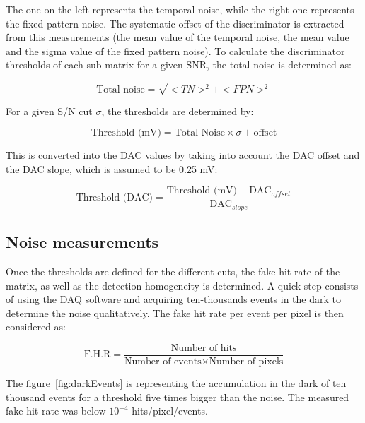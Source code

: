   The one on the left represents the temporal noise, while the right one represents the fixed pattern noise.
  The systematic offset of the discriminator is extracted from this measurements (the mean value of the temporal noise, the mean value and the sigma value of the fixed pattern noise).
  To calculate the discriminator thresholds of each sub-matrix for a given \gls{SNR}, the total noise is determined as:
  
  \begin{equation}
    \text{Total noise} = \sqrt{<TN>^2 + <FPN>^2}
  \end{equation}

  For a given S/N cut $\sigma$, the thresholds are determined by:

  \begin{equation}
    \text{Threshold (mV)} = \text{Total Noise} \times \sigma + \text{offset}
  \end{equation}

  This is converted into the DAC values by taking into account the DAC offset and the DAC slope, which is assumed to be 0.25 mV:
  
  \begin{equation}
    \text{Threshold (DAC)} = \frac{\text{Threshold (mV)} - \text{DAC}_{offset}}{\text{DAC}_{slope}}
  \end{equation}



  \subsection{Noise measurements}

  Once the thresholds are defined for the different cuts, the fake hit rate of the matrix, as well as the detection homogeneity is determined.
  A quick step consists of using the DAQ software and acquiring ten-thousands events in the dark to determine the noise qualitatively. 
  The fake hit rate per event per pixel is then considered as:

  \begin{equation}
    \text{F.H.R} = \frac{\text{Number of hits}}{\text{Number of events} \times \text{Number of pixels}} 
  \end{equation}
  
  The figure~\ref{fig:darkEvents} is representing the accumulation in the dark of ten thousand events for a threshold five times bigger than the noise.
  The measured fake hit rate was below $10^{-4}$ hits/pixel/events.

